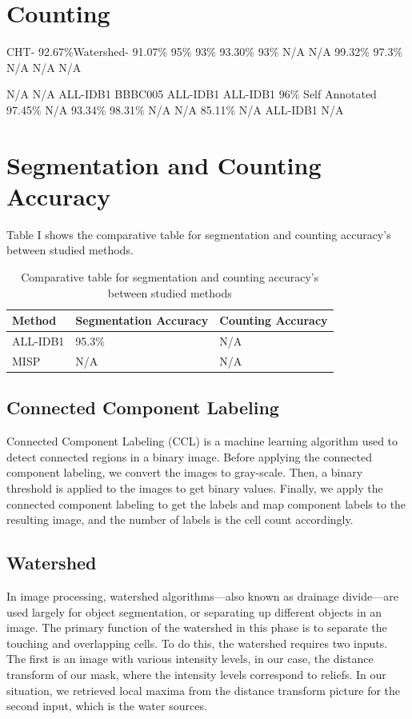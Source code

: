 \documentclass[conference]{IEEEtran}
\begin{document}
\section{Counting}
CHT- 92.67\%Watershed- 91.07\%
95\%
93\%
93.30\%
93\%
N/A
N/A
99.32\%
97.3\%
N/A
N/A
N/A

N/A
N/A
ALL-IDB1
BBBC005
ALL-IDB1
ALL-IDB1
96\%
Self Annotated
97.45\%
N/A
93.34\%
98.31\%
N/A
N/A
85.11\%
N/A
ALL-IDB1
N/A

\section{Segmentation and Counting Accuracy}
Table I shows the comparative table for segmentation and counting accuracy's between studied methods.
\begin{table}[htbp]
\centering
\caption{Comparative table for segmentation and counting accuracy's between studied methods}
\label{tab:label}
\begin{tabular}{lll}
\hline
Method & Segmentation Accuracy & Counting Accuracy \\
\hline
ALL-IDB1 & 95.3\% & N/A \\
MISP & N/A & N/A \\
\hline
\end{tabular}
\end{table}
\subsection{Connected Component Labeling}
Connected Component Labeling (CCL) is a machine learning algorithm used to detect connected regions in a binary image. Before applying the connected component labeling, we convert the images to gray-scale. Then, a binary threshold is applied to the images to get binary values. Finally, we apply the connected component labeling to get the labels and map component labels to the resulting image, and the number of labels is the cell count accordingly.
\subsection{Watershed}
In image processing, watershed algorithms—also known as drainage divide—are used largely for object segmentation, or separating up different objects in an image. The primary function of the watershed in this phase is to separate the touching and overlapping cells. To do this, the watershed requires two inputs. The first is an image with various intensity levels, in our case, the distance transform of our mask, where the intensity levels correspond to reliefs. In our situation, we retrieved local maxima from the distance transform picture for the second input, which is the water sources.
\end{document}
